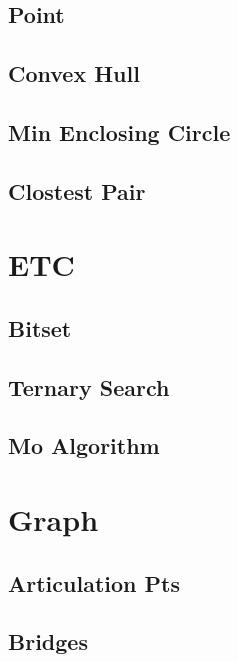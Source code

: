 \subsection{Point}
\raggedbottom
\hrulefill
\subsection{Convex Hull}
\raggedbottom
\hrulefill
\subsection{Min Enclosing Circle}
\raggedbottom
\hrulefill
\subsection{Clostest Pair}
\raggedbottom
\hrulefill

\section{ETC}
\subsection{Bitset}
\raggedbottom
\hrulefill
\subsection{Ternary Search}
\raggedbottom
\hrulefill
\subsection{Mo Algorithm}
\raggedbottom
\hrulefill

\section{Graph}
\subsection{Articulation Pts}
\raggedbottom
\hrulefill
\subsection{Bridges}
\raggedbottom
\hrulefill
